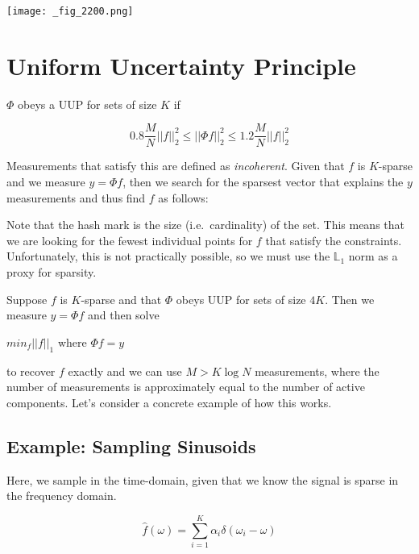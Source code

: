 \documentclass[letterpaper,10pt,english]{/usr/lib/python2.7/site-packages/sphinx/texinputs/sphinxhowto}
\newenvironment{InvisibleVerbatim}
        {\begin{mdframed}[leftmargin=0.1\linewidth,innerleftmargin=3pt,innerrightmargin=3pt, userdefinedwidth=1\linewidth, linewidth=0pt, linecolor=white, usetwoside=false]}
        {\end{mdframed}}
\begin{document}
                \begin{InvisibleVerbatim}
                \vspace{-0.5\baselineskip}\begin{center}
    \texttt{[image: \_fig\_2200.png]}
    \par
    \end{center}
            \end{InvisibleVerbatim}
            
        
    
\section{Uniform Uncertainty Principle
}$\Phi$ obeys a UUP for sets of size $K$ if

\[    0.8 \frac{M}{N} ||f||_2^2 \leq || \Phi f||_2^2 \leq 1.2 \frac{M}{N} ||f||_2^2 \]

Measurements that satisfy this are defined as \emph{incoherent}. Given
that $f$ is $K$-sparse and we measure $y=\Phi f$, then we search for the
sparsest vector that explains the $y$ measurements and thus find $f$ as
follows:


Note that the hash mark is the size (i.e.~cardinality) of the set. This
means that we are looking for the fewest individual points for $f$ that
satisfy the constraints. Unfortunately, this is not practically
possible, so we must use the $\mathbb{L}_1$ norm as a proxy for
sparsity.

Suppose $f$ is $K$-sparse and that $\Phi$ obeys UUP for sets of size
$4K$. Then we measure $y=\Phi f$ and then solve

$min_f ||f||_1$ where $\Phi f = y$

to recover $f$ exactly and we can use $M > K \log N$ measurements, where
the number of measurements is approximately equal to the number of
active components. Let's consider a concrete example of how this works.
\subsection{Example: Sampling Sinusoids
}Here, we sample in the time-domain, given that we know the signal is
sparse in the frequency domain.

\[ \hat{f}(\omega) = \sum_{i=1}^K \alpha_i \delta(\omega_i-\omega) \]
\end{document}
